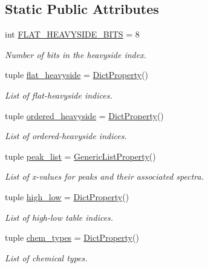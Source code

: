 \subsection*{Static Public Attributes}
\begin{DoxyCompactItemize}
\item 
int \hyperlink{classbackend_1_1_matcher_a489df5b5c1e345f76ee524685e0856c1}{FLAT\_\-HEAVYSIDE\_\-BITS} = 8
\begin{DoxyCompactList}\small\item\em Number of bits in the heavyside index. \item\end{DoxyCompactList}\item 
tuple \hyperlink{classbackend_1_1_matcher_a8edb3e00a469bccb3c6a988e2162f51e}{flat\_\-heavyside} = \hyperlink{classbackend_1_1_dict_property}{DictProperty}()
\begin{DoxyCompactList}\small\item\em List of flat-\/heavyside indices. \item\end{DoxyCompactList}\item 
tuple \hyperlink{classbackend_1_1_matcher_a57274e1e90ee992a9ae6b89edb934a43}{ordered\_\-heavyside} = \hyperlink{classbackend_1_1_dict_property}{DictProperty}()
\begin{DoxyCompactList}\small\item\em List of ordered-\/heavyside indices. \item\end{DoxyCompactList}\item 
tuple \hyperlink{classbackend_1_1_matcher_a38ebd0204232520ab5a9d90a6c17b971}{peak\_\-list} = \hyperlink{classbackend_1_1_generic_list_property}{GenericListProperty}()
\begin{DoxyCompactList}\small\item\em List of x-\/values for peaks and their associated spectra. \item\end{DoxyCompactList}\item 
tuple \hyperlink{classbackend_1_1_matcher_abbbeca0d3792b2ad0d9046572fd7f16f}{high\_\-low} = \hyperlink{classbackend_1_1_dict_property}{DictProperty}()
\begin{DoxyCompactList}\small\item\em List of high-\/low table indices. \item\end{DoxyCompactList}\item 
tuple \hyperlink{classbackend_1_1_matcher_aaf40dbbcd44a623683ceae35f6e5e9ea}{chem\_\-types} = \hyperlink{classbackend_1_1_dict_property}{DictProperty}()
\begin{DoxyCompactList}\small\item\em List of chemical types. \item\end{DoxyCompactList}\end{DoxyCompactItemize}


